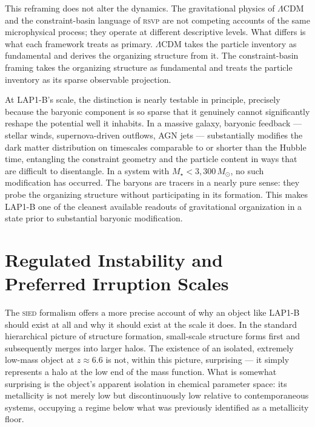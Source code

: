 \documentclass[12pt, a4paper]{article}
\newcommand{\Msun}{M_{\odot}}
\newcommand{\Mstar}{M_{\star}}
\newcommand{\RSVP}{\textsc{rsvp}}
\newcommand{\SIED}{\textsc{sied}}
\theoremstyle{definition}
\begin{document}
This reframing does not alter the dynamics. The gravitational physics of
$\Lambda$CDM and the constraint-basin language of \RSVP{} are not competing
accounts of the same microphysical process; they operate at different
descriptive levels. What differs is what each framework treats as primary.
$\Lambda$CDM takes the particle inventory as fundamental and derives the
organizing structure from it. The constraint-basin framing takes the
organizing structure as fundamental and treats the particle inventory as its
sparse observable projection.

At LAP1-B's scale, the distinction is nearly testable in principle, precisely
because the baryonic component is so sparse that it genuinely cannot
significantly reshape the potential well it inhabits. In a massive galaxy,
baryonic feedback --- stellar winds, supernova-driven outflows, AGN jets ---
substantially modifies the dark matter distribution on timescales comparable
to or shorter than the Hubble time, entangling the constraint geometry and
the particle content in ways that are difficult to disentangle. In a system
with $\Mstar < 3{,}300\,\Msun$, no such modification has occurred. The baryons
are tracers in a nearly pure sense: they probe the organizing structure without
participating in its formation. This makes LAP1-B one of the cleanest available
readouts of gravitational organization in a state prior to substantial baryonic
modification.

\section{Regulated Instability and Preferred Irruption Scales}
\label{sec:sied}

The \SIED{} formalism offers a more precise account of why an object like
LAP1-B should exist at all and why it should exist at the scale it does.
In the standard hierarchical picture of structure formation, small-scale
structure forms first and subsequently merges into larger halos. The existence
of an isolated, extremely low-mass object at $z \approx 6.6$ is not, within
this picture, surprising --- it simply represents a halo at the low end of the
mass function. What is somewhat surprising is the object's apparent isolation
in chemical parameter space: its metallicity is not merely low but
discontinuously low relative to contemporaneous systems, occupying a regime
below what was previously identified as a metallicity floor.
\end{document}
